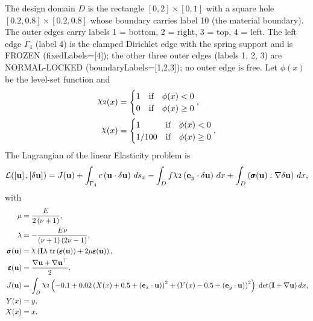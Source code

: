 \documentclass[preview]{standalone}
\let\oldcdot\cdot
\let\cdot\oldcdot
\begin{document}
The design domain $D$ is the rectangle $[0,2]\times[0,1]$ with a square hole $[0.2,0.8]\times[0.2,0.8]$ whose boundary carries label 10 (the material boundary).  The outer edges carry labels 1 = bottom, 2 = right, 3 = top, 4 = left.  The left edge $\Gamma_{4}$ (label 4) is the clamped Dirichlet edge with the spring support and is FROZEN (fixedLabels=[4]); the other three outer edges (labels 1, 2, 3) are NORMAL-LOCKED (boundaryLabels=[1,2,3]); no outer edge is free.
Let $\phi(x)$ be the level-set function and
 \begin{align*}\raisebox{\depth}{$\chi_2$}(x) &= \begin{cases} 1 & \mbox{if}\quad \phi(x) < 0 \\ 0 & \mbox{if}\quad \phi(x)  \ge 0 \end{cases},\\
\raisebox{\depth}{$\chi$}(x) &= \begin{cases} 1 & \mbox{if}\quad \phi(x) < 0 \\ 1/100 & \mbox{if}\quad \phi(x)  \ge 0 \end{cases}.\end{align*}
The Lagrangian of the linear Elasticity problem is
\begin{dmath*}
\mathcal L(\left[ {\mathbf{ u }}\right],\left[ {\delta\mathbf{  u }}\right]) = J({\mathbf{ u }}) +  \int_{\Gamma_{4}} c \left( {\mathbf{ u }} \cdot {\delta\mathbf{  u }} \right) \,ds_x -  \int_{D} f \raisebox{\depth}{$\chi_2$} \left( \mathbf e_y \cdot {\delta\mathbf{  u }} \right) \,dx +  \int_{D} \left( \pmb \sigma({\mathbf{ u }}) \mathrel{:}  \nabla {\delta\mathbf{  u }}  \right) \,dx , 
\end{dmath*}
with 
\begin{align*}
\mu &= \frac{E}{2 \left(\nu + 1\right)},\\
\lambda &= - \frac{E \nu}{\left(\nu + 1\right) \left(2 \nu - 1\right)},\\
\pmb \sigma({\mathbf{ u }}) &= \raisebox{\depth}{$\chi$} \left(\mathbf{I} \lambda  \,\operatorname{tr}\left(\pmb \varepsilon({\mathbf{ u }})\right)  + 2 \mu \pmb \varepsilon({\mathbf{ u }})\right),\\
\pmb \varepsilon({\mathbf{ u }}) &= \frac{ \nabla {\mathbf{ u }}  +   \nabla {\mathbf{ u }} ^\top }{2},\\
J({\mathbf{ u }}) &=  \int_{D} \raisebox{\depth}{$\chi_2$} \left(-0.1 + 0.02 \left(X(x) + 0.5 + \left( \mathbf e_x \cdot {\mathbf{ u }} \right)\right)^{2} + \left(Y(x) - 0.5 + \left( \mathbf e_y \cdot {\mathbf{ u }} \right)\right)^{2}\right)  \;\operatorname{det}(\mathbf{I} +  \nabla {\mathbf{ u }} )  \,dx,\\
Y(x) &= y,\\
X(x) &= x.
 \end{align*}
\end{document}
